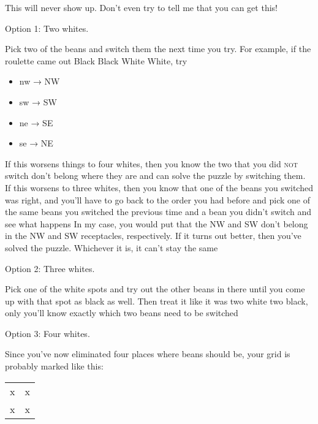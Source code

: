 \documentclass[12pt]{article}
\providecommand{\tightlist}{%
  \setlength{\itemsep}{0pt}\setlength{\parskip}{0pt}}
\newcommand\textlcsc[1]{\texorpdfstring{\textsc{\MakeLowercase{#1}}}{#1}}
\begin{document}
This will never show up. Don't even try to tell me that you can get
this!

Option 1: Two whites.

Pick two of the beans and switch them the next time you try. For
example, if the roulette came out Black Black White White, try

\begin{itemize}
\tightlist
\item
  nw → NW
\item
  sw → SW
\item
  ne → SE
\item
  se → NE
\end{itemize}

If this worsens things to four whites, then you know the two that you did
\textlcsc{NOT} switch don't belong where they are and can solve the puzzle by
switching them. If this worsens to three whites, then you know that one of
the beans you switched was right, and you'll have to go back to the order you
had before and pick one of the same beans you switched the previous time and
a bean you didn't switch and see what happens In my case, you would put that
the NW and SW don't belong in the NW and SW receptacles, respectively. If it
turns out better, then you've solved the puzzle. Whichever it is, it can't
stay the same

Option 2: Three whites.

Pick one of the white spots and try out the other beans in there until
you come up with that spot as black as well. Then treat it like it was
two white two black, only you'll know exactly which two beans need to be
switched

Option 3: Four whites.

Since you've now eliminated four places where beans should be, your grid
is probably marked like this:

\begin{longtable}[]{@{}ll@{}}
\toprule
\begin{minipage}[t]{0.05\columnwidth}\raggedright\strut
x
\strut\end{minipage} &
\begin{minipage}[t]{0.05\columnwidth}\raggedright\strut
x
\strut\end{minipage}\tabularnewline
\begin{minipage}[t]{0.05\columnwidth}\raggedright\strut
x
\strut\end{minipage} &
\begin{minipage}[t]{0.05\columnwidth}\raggedright\strut
x
\strut\end{minipage}\tabularnewline
\bottomrule
\end{longtable}
\end{document}
